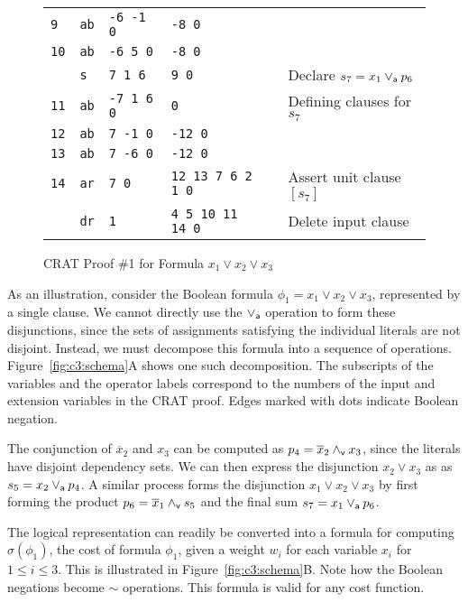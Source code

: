 \documentclass{llncs}
\newcommand{\pand}{\mathbin{\land_{\sf v}}}
\newcommand{\por}{\mathbin{\lor_{\sf a}}}
\newcommand{\obar}[1]{\overline{#1}}
\newcommand{\oneminus}{{\sim}}
\newcommand{\cost}{\sigma}
\begin{document}
\begin{figure}
{\begin{tabular}{llllll}
    {\tt 9} & {\tt ab}  & {\tt -6 -1 0}    & {\tt -8 0} & &  \\  %
    {\tt 10} & {\tt ab}  & {\tt -6 5 0}    & {\tt -8 0} & &  \\  %
             & {\tt s}   & {\tt 7 1 6}   & {\tt 9 0}  & & Declare $s_7 = x_1 \por p_6$ \\
    {\tt 11} & {\tt ab}  & {\tt -7 1 6 0}  & {\tt 0}    & & Defining clauses for $s_7$ \\ 
    {\tt 12} & {\tt ab}  & {\tt  7 -1 0}    & {\tt -12 0} & &  \\  %
    {\tt 13} & {\tt ab}  & {\tt  7 -6 0}    & {\tt -12 0} & &  \\  %
    {\tt 14} & {\tt ar}  & {\tt 7 0} & {\tt 12 13 7 6 2 1 0} & & Assert unit clause $[s_7]$ \\
             & {\tt dr}  & {\tt 1}  & {\tt 4 5 10 11 14 0} & & Delete input clause \\
  \end{tabular}
  }
  \caption{CRAT Proof \#1 for Formula $x_1 \lor x_2 \lor x_3$}
  \label{fig:c3:crat}
\end{figure}
    
As an illustration, consider the Boolean formula
$\phi_1 = x_1 \lor x_2 \lor x_3$,
represented by a single clause.  We cannot directly use the
$\por$ operation to form these disjunctions, since the sets of assignments
satisfying the individual literals are not disjoint.  Instead, we must
decompose this formula into a sequence of operations.
Figure~\ref{fig:c3:schema}A shows one such decomposition.
The subscripts of the variables and the operator labels correspond to
the numbers of the input and extension variables in the CRAT proof.
Edges marked with dots indicate Boolean negation.

The conjunction of $\obar{x}_2$ and $x_3$ can be computed as $p_4 =
\obar{x}_2 \pand x_3$, since the literals have disjoint dependency
sets. We can then express the disjunction $x_2 \lor x_3$ as
as $s_5 = x_2 \por p_4$.  A similar process forms the
disjunction $x_1 \lor x_2 \lor x_3$ by first forming the product $p_6
= \obar{x}_1 \pand s_5$ and the final sum $s_7 = x_1 \por p_6$.

The logical representation can readily be converted into a formula for
computing $\cost(\phi_1)$, the cost of formula $\phi_1$, given a weight
$w_i$ for each variable $x_i$ for $1 \leq i \leq 3$.  This is
illustrated in Figure~\ref{fig:c3:schema}B\@.  Note how the Boolean
negations become $\oneminus$ operations.  This formula is valid for
any cost function.
\end{document}
